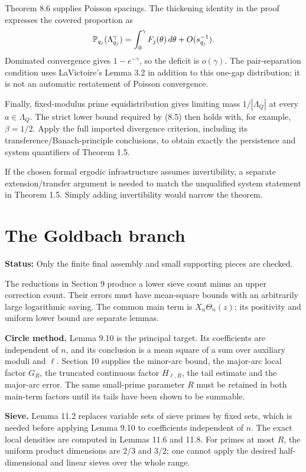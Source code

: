 \documentclass[11pt]{article}
\newcommand{\status}[1]{\textbf{Status:} #1.}
\newcommand{\page}{\newpage}
\begin{document}
Theorem 8.6 supplies Poisson spacings. The thickening identity in the proof
expresses the covered proportion as
\[
 \mathbb P_{q_j}(\Lambda_{q_j}^{\gamma})
 =\int_0^\gamma F_j(\theta)\,d\theta+O(s_{q_j}^{-1}).
\]
Dominated convergence gives \(1-e^{-\gamma}\), so the deficit is \(o(\gamma)\).
The pair-separation condition uses LaVictoire's Lemma 3.2 in addition to this
one-gap distribution; it is not an automatic restatement of Poisson convergence.

Finally, fixed-modulus prime equidistribution gives limiting mass
\(1/|\Lambda_Q|\) at every \(a\in\Lambda_Q\). The strict lower bound required
by (8.5) then holds with, for example, \(\beta=1/2\). Apply the full imported
divergence criterion, including its transference/Banach-principle conclusions,
to obtain exactly the persistence and system quantifiers of Theorem 1.5.

If the chosen formal ergodic infrastructure assumes invertibility, a separate
extension/transfer argument is needed to match the unqualified system statement
in Theorem 1.5. Simply adding invertibility would narrow the theorem.

\page
\section{The Goldbach branch}
\status{Only the finite final assembly and small supporting pieces are checked}

The reductions in Section 9 produce a lower sieve count minus an upper correction
count. Their errors must have mean-square bounds with an arbitrarily large
logarithmic saving. The common main term is
\(X_n\Theta_n(z)\); its positivity and uniform lower bound are separate lemmas.

\textbf{Circle method.} Lemma 9.10 is the principal target. Its coefficients are
independent of \(n\), and its conclusion is a mean square of a sum over auxiliary
moduli and \(\ell\). Section 10 supplies the minor-arc bound, the major-arc local
factor \(G_R\), the truncated continuous factor \(H_{\ell,R}\), the tail estimate
and the major-arc error. The same small-prime parameter \(R\) must be retained
in both main-term factors until its tails have been shown to be summable.

\textbf{Sieve.} Lemma 11.2 replaces variable sets of sieve primes by fixed sets,
which is needed before applying Lemma 9.10 to coefficients independent of \(n\).
The exact local densities are computed in Lemmas 11.6 and 11.8. For primes at
most \(R\), the uniform product dimensions are \(2/3\) and \(3/2\); one cannot
apply the desired half-dimensional and linear sieves over the whole range.
\end{document}
